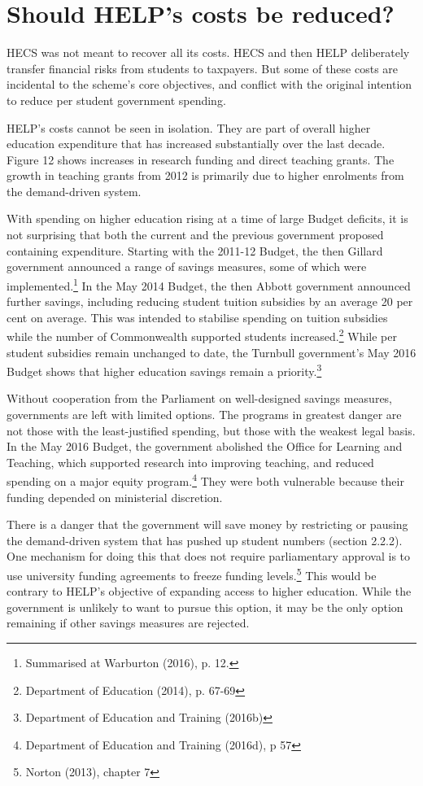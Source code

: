 \documentclass[embargoed]{grattan}
\begin{document}
\section{Should HELP's costs be reduced?}\label{should-helps-costs-be-reduced}

HECS was not meant to recover all its costs. HECS and then HELP deliberately transfer financial risks from students to taxpayers. But some of these costs are incidental to the scheme's core objectives, and conflict with the original intention to reduce per student government spending.

HELP's costs cannot be seen in isolation. They are part of overall higher education expenditure that has increased substantially over the last decade. Figure 12 shows increases in research funding and direct teaching grants. The growth in teaching grants from 2012 is primarily due to higher enrolments from the demand-driven system.

With spending on higher education rising at a time of large Budget deficits, it is not surprising that both the current and the previous government proposed containing expenditure. Starting with the 2011-12 Budget, the then Gillard government announced a range of savings measures, some of which were implemented.\footnote{Summarised at Warburton (2016), p. 12.} In the May 2014 Budget, the then Abbott government announced further savings, including reducing student tuition subsidies by an average 20 per cent on average. This was intended to stabilise spending on tuition subsidies while the number of Commonwealth supported students increased.\footnote{Department of Education (2014), p. 67-69} While per student subsidies remain unchanged to date, the Turnbull government's May 2016 Budget shows that higher education savings remain a priority.\footnote{Department of Education and Training (2016b)}

Without cooperation from the Parliament on well-designed savings measures, governments are left with limited options. The programs in greatest danger are not those with the least-justified spending, but those with the weakest legal basis. In the May 2016 Budget, the government abolished the Office for Learning and Teaching, which supported research into improving teaching, and reduced spending on a major equity program.\footnote{Department of Education and Training (2016d), p 57} They were both vulnerable because their funding depended on ministerial discretion.

There is a danger that the government will save money by restricting or pausing the demand-driven system that has pushed up student numbers (section 2.2.2). One mechanism for doing this that does not require parliamentary approval is to use university funding agreements to freeze funding levels.\footnote{Norton (2013), chapter 7} This would be contrary to HELP's objective of expanding access to higher education. While the government is unlikely to want to pursue this option, it may be the only option remaining if other savings measures are rejected.
\end{document}
